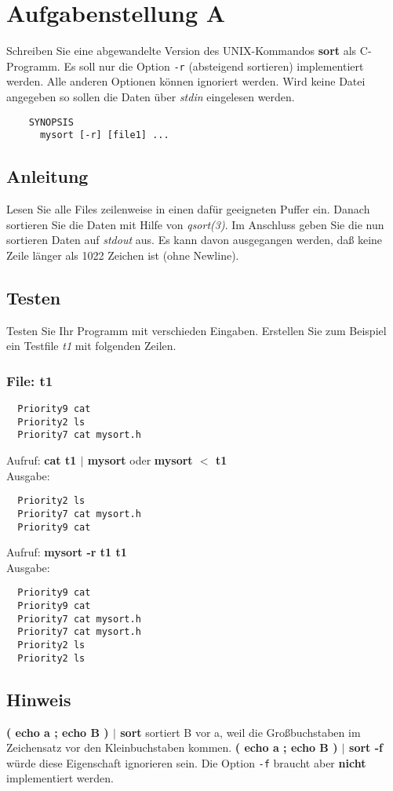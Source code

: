 




\section*{Aufgabenstellung A}
Schreiben Sie eine abgewandelte Version des UNIX-Kommandos {\bf sort} als C-Programm. Es soll nur die Option \verb|-r| (absteigend sortieren) implementiert werden. Alle anderen Optionen können ignoriert werden. Wird keine Datei angegeben so sollen die Daten \"uber \emph{stdin} eingelesen werden.

\begin{verbatim}
	SYNOPSIS
	  mysort [-r] [file1] ...
\end{verbatim}

\subsection*{Anleitung}
Lesen Sie alle Files zeilenweise in einen dafür geeigneten Puffer ein.
Danach sortieren Sie die Daten mit Hilfe von \emph{qsort(3)}. Im Anschluss geben Sie die nun sortieren Daten auf \emph{stdout} aus. Es kann davon ausgegangen werden, daß keine Zeile länger als 1022 Zeichen ist (ohne Newline).

\subsection*{Testen}
Testen Sie Ihr Programm mit verschieden Eingaben. Erstellen Sie zum Beispiel ein Testfile \emph{t1} mit folgenden Zeilen.

\subsubsection*{File: t1}
\begin{verbatim}
  Priority9 cat
  Priority2 ls
  Priority7 cat mysort.h
\end{verbatim}
Aufruf: {\bf cat t1 $|$ mysort} oder {\bf mysort $<$ t1} \\
Ausgabe: 
\begin{verbatim}
  Priority2 ls
  Priority7 cat mysort.h
  Priority9 cat
\end{verbatim}


Aufruf: {\bf mysort -r t1 t1} \\
Ausgabe: 
\begin{verbatim}
  Priority9 cat
  Priority9 cat
  Priority7 cat mysort.h
  Priority7 cat mysort.h
  Priority2 ls
  Priority2 ls
\end{verbatim}

\subsection*{Hinweis}
{\bf { ( echo a ; echo B )} $|$ sort} sortiert B vor a, weil die Großbuchstaben im Zeichensatz vor den Kleinbuchstaben kommen. {\bf { ( echo a ; echo B )} $|$ sort -f} würde diese Eigenschaft ignorieren sein. Die Option \verb|-f| braucht aber {\bf nicht} implementiert werden.

\osueguidelinesone


